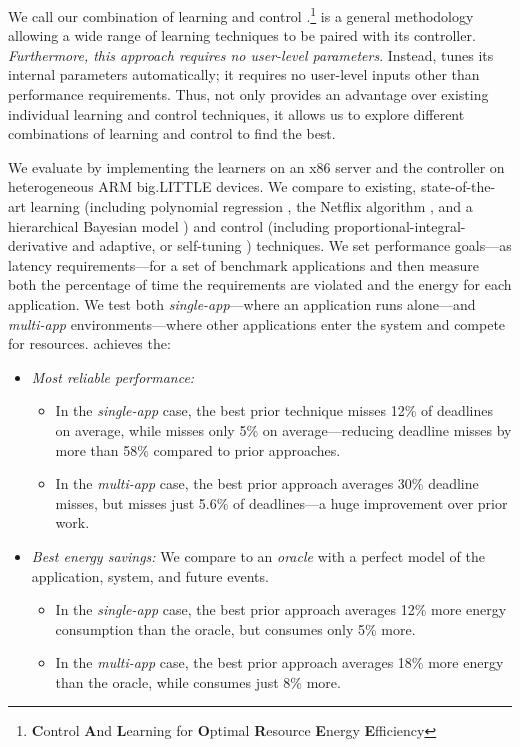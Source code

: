 We call our combination of learning and control
\SYSTEM{}.\footnote{\textbf{C}ontrol \textbf{A}nd \textbf{L}earning
  for \textbf{O}ptimal \textbf{R}esource \textbf{E}nergy
  \textbf{E}fficiency} \SYSTEM{} is a general methodology allowing a
wide range of learning techniques to be paired with its controller.
\emph{Furthermore, this approach requires no user-level parameters}.
Instead, \SYSTEM{} tunes its internal parameters automatically; \ie{}
it requires no user-level inputs other than performance requirements.
Thus, \SYSTEM{} not only provides an advantage over existing individual
learning and control techniques, it allows us to explore different
combinations of learning and control to find the best.

We evaluate \SYSTEM{} by implementing the learners on an x86 server
and the controller on heterogeneous ARM big.LITTLE devices.  We
compare \SYSTEM{} to existing, state-of-the-art learning (including
polynomial regression \cite{Koala,dubach2010}, the Netflix algorithm
\cite{netflix,Paragon}, and a hierarchical Bayesian model \cite{LEO})
and control (including proportional-integral-derivative
\cite{Hellerstein2004a} and adaptive, or self-tuning
\cite{HandbookControl}) techniques.  We set performance goals---as
latency requirements---for a set of benchmark applications and then
measure both the percentage of time the requirements are violated and
the energy for each application.  We test both
\emph{single-app}---where an application runs alone---and
\emph{multi-app} environments---where other applications enter the
system and compete for resources.  \SYSTEM{} achieves the:
\begin{itemize}[leftmargin=1em]
\item \textit{Most reliable performance:}
  \begin{itemize}[leftmargin=1em]
  \item In the \emph{single-app} case, the best prior technique misses
    12\% of deadlines on average, while \SYSTEM{} misses only 5\% on
    average---reducing deadline misses by more than 58\% compared to
    prior approaches.
  \item In the \emph{multi-app} case, the best prior approach averages
    30\% deadline misses, but \SYSTEM{} misses just 5.6\% of
    deadlines---a huge improvement over prior work.
  \end{itemize}
\item \textit{Best energy savings:} We compare to an \emph{oracle}
  with a perfect model of the application, system, and future events.
  \begin{itemize}[leftmargin=1em]
  \item In the \emph{single-app} case, the best prior approach
    averages 12\% more energy consumption than the oracle, but
    \SYSTEM{} consumes only 5\% more.
  \item In the \emph{multi-app} case, the best prior approach averages
    18\% more energy than the oracle, while \SYSTEM{} consumes just
    8\% more.
  \end{itemize}
\end{itemize}

